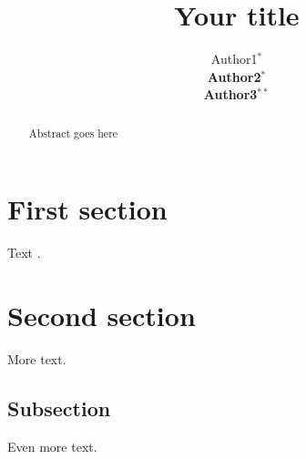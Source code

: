 \documentclass[a4paper,12pt,twoside]{article}
\begin{document}
\title{Your title}

\author{Author1$^*$ \\
{\normalsize \bf Author2}$^*$ \\
{\normalsize \bf Author3}$^{**}$ 
\AND {}
\AND {} }


\maketitle\thispagestyle{empty} %


\begin{abstract}
Abstract goes here
\end{abstract}

\section{First section}

Text \cite{Banko2001a}.

\section{Second section}

More text.

\subsection{Subsection}

Even more text.


 
  
\end{document}
